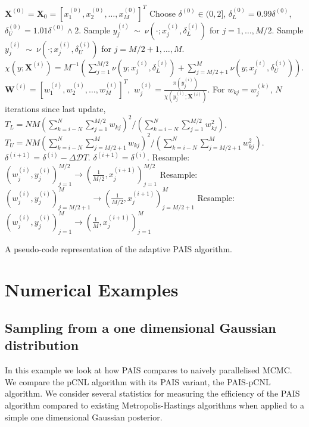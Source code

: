 \documentclass[final]{siamltex}
\newcommand{\D}{\mathcal{D}}
\newcommand{\X}{{\mathbf X}}
\newcommand{\W}{{\mathbf W}}
\begin{document}
\begin{table}
\begin{mdframed}
\begin{algorithmic}
\STATE $\X^{(0)} = \X_0 = [x_1^{(0)},x_2^{(0)},\ldots,x_M^{(0)}]^T$
\STATE Choose $\delta^{(0)} \in (0, 2]$, $\delta_L^{(0)} = 0.99\delta^{(0)}$, $\delta_U^{(0)} = 1.01\delta^{(0)} \wedge 2$.
\STATE Sample $y_j^{(i)}~\sim~\nu(\cdot;x_j^{(i)},\delta_L^{(i)})$ for $j=1, \ldots,M/2$.
\STATE Sample $y_j^{(i)}~\sim~\nu(\cdot;x_j^{(i)},\delta_U^{(i)})$ for $j=M/2+1, \ldots, M$.
\STATE $\chi(y;\X^{(i)}) = M^{-1}
\left(\sum_{j=1}^{M/2} \nu(y;x_j^{(i)},\delta_L^{(i)})+\sum_{j=M/2+1}^{M} \nu(y;x_j^{(i)},\delta_U^{(i)})\right)$.
\STATE $\W^{(i)} = [w_1^{(i)},w_2^{(i)},\ldots,w_M^{(i)}]^T,$ \quad $w^{(i)}_j =
\frac{\pi(y_j^{(i)})}{\chi(y_j^{(i)};\X^{(i)})}$.
	\STATE For $w_{kj} = w_j^{(k)}$, $N$ iterations since last update,
	\STATE $T_L = NM(\sum_{k=i-N}^N\sum_{j=1}^{M/2} w_{kj})^2/(\sum_{k=i-N}^N\sum_{j=1}^{M/2} w_{kj}^2)$.
	\STATE $T_U = NM(\sum_{k=i-N}^N\sum_{j=M/2+1}^M w_{kj})^2/(\sum_{k=i-N}^N\sum_{j=M/2+1}^M w_{kj}^2)$.
	\STATE $\delta^{(i+1)} = \delta^{(i)} - \Delta\D T$.
\ELSE
	\STATE $\delta^{(i+1)} = \delta^{(i)}$.
\ENDIF
{}
	\STATE Resample: $(w_j^{(i)},y_j^{(i)})_{j=1}^{M/2} \rightarrow (\frac{1}{M/2}, x_j^{(i+1)})_{j=1}^{M/2}$
	\STATE Resample: $(w_j^{(i)},y_j^{(i)})_{j=M/2+1}^M \rightarrow (\frac{1}{M/2}, x_j^{(i+1)})_{j=M/2+1}^M$
\ELSE
	\STATE Resample: $(w_j^{(i)},y_j^{(i)})_{j=1}^M \rightarrow (\frac{1}{M}, x_j^{(i+1)})_{j=1}^M$
\ENDIF
\ENDFOR
\end{algorithmic}
\end{mdframed}\caption{A pseudo-code representation of the adaptive
  PAIS algorithm.}
\label{tab:adapt}
\end{table}

\section{Numerical Examples}\label{sec:num}

\subsection{Sampling from a one dimensional Gaussian distribution}\label{sec:problem 1}

In this example we look at how PAIS compares to naively parallelised MCMC. We compare the pCNL algorithm \cite{cotter2013mcmc} with its PAIS variant, the PAIS-pCNL algorithm. We consider several statistics for measuring the efficiency of the PAIS algorithm compared to existing Metropolis-Hastings algorithms when applied to a simple one dimensional Gaussian posterior.
\end{document}
